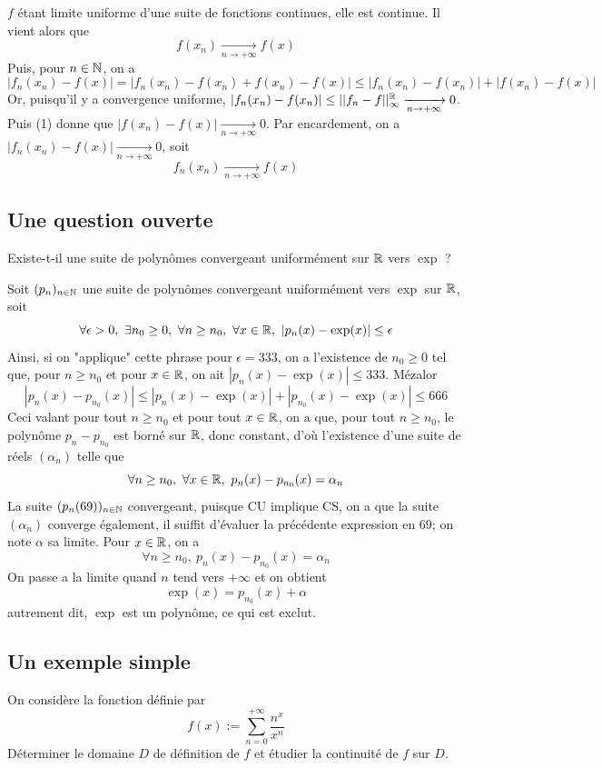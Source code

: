 \begin{sol}
	$f$ étant limite uniforme d'une suite de fonctions continues, elle est continue. Il vient alors que \[f(x_n)\xrightarrow[n\to+\infty]{} f(x)\tag{1}\]
	Puis, pour $n\in\mathbb{N}$, on a \[|f_n(x_n)-f(x)|=|f_n(x_n)-f(x_n)+f(x_n)-f(x)|\leq|f_n(x_n)-f(x_n)|+|f(x_n)-f(x)|\]
	Or, puisqu'il y a convergence uniforme, $|f_n(x_n)-f(x_n)|\leq ||f_n-f||_\infty^{\mathbb{R}}\xrightarrow[n\to+\infty]{} 0$. Puis (1) donne que $|f(x_n)-f(x)|\xrightarrow[n\to+\infty]{}0$. Par encardement, on a $|f_n(x_n)-f(x)|\xrightarrow[n\to+\infty]{} 0$, soit \[\boxed{f_n(x_n)\xrightarrow[n\to+\infty]{}f(x)}\]
\end{sol}

\subsection{Une question ouverte}
\begin{exo}
	Existe-t-il une suite de polynômes convergeant uniformément sur $\mathbb{R}$ vers $\exp$ ?
\end{exo}

\begin{sol}
	Soit $(p_n)_{n\in\mathbb{N}}$ une suite de polynômes convergeant uniformément vers $\exp$ sur $\mathbb{R}$, soit \[\forall \epsilon > 0,\ \exists n_0\geq 0,\ \forall n\geq n_0,\ \forall x\in\R,\ |p_n(x)-\exp(x)|\leq \epsilon\]
	Ainsi, si on "applique" cette phrase pour $\epsilon = 333$, on a l'existence de $n_0\geq 0$ tel que, pour $n\geq n_0$ et pour $x\in\mathbb{R}$, on ait $|p_n(x)-\exp(x)|\leq 333$. Mézalor \[|p_n(x)-p_{n_0}(x)|\leq |p_n(x)-\exp(x)|+|p_{n_0}(x)-\exp(x)|\leq 666\]
	Ceci valant pour tout $n\geq n_0$ et pour tout $x\in\mathbb{R}$, on a que, pour tout $n\geq n_0$, le polynôme $p_n-p_{n_0}$ est borné sur $\mathbb{R}$, donc constant, d'où l'existence d'une suite de réels $(\alpha_n)$ telle que \[\forall n\geq n_0,\ \forall x\in\mathbb{R},\ p_n(x)-p_{n_0}(x)=\alpha_n\]
	La suite $(p_n(69))_{n\in\mathbb{N}}$ convergeant, puisque CU implique CS, on a que la suite $(\alpha_n)$ converge également, il suiffit d'évaluer la précédente expression en $69$; on note $\alpha$ sa limite. Pour $x\in\mathbb{R}$, on a \[\forall n\geq n_0,\ p_n(x)-p_{n_0}(x)=\alpha_n\]
	On passe a la limite quand $n$ tend vers $+\infty$ et on obtient \[\exp(x)=p_{n_0}(x)+\alpha\]
	autrement dit, $\exp$ est un polynôme, ce qui est exclut.
\end{sol}

\subsection{Un exemple simple}
\begin{exo}
	On considère la fonction définie par \[f(x):=\sum_{n=0}^{+\infty}\frac{n^x}{x^n}\]
	Déterminer le domaine $D$ de définition de $f$ et étudier la continuité de $f$ sur $D$.
\end{exo}


